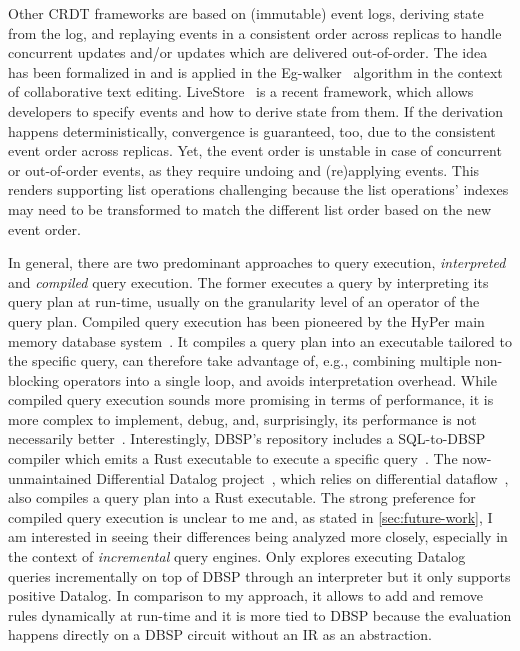 Other \ac{CRDT} frameworks are based on (immutable) event logs, deriving state
from the log, and replaying events in a consistent order across replicas to
handle concurrent updates and/or updates which are delivered out-of-order.
The idea has been formalized in \cite{baquero2017pure} and is applied in
the Eg-walker~\cite{egwalker} algorithm in the context of collaborative text
editing.
LiveStore~\cite{livestore} is a recent framework, which allows developers
to specify events and how to derive state from them.
If the derivation happens deterministically, convergence is guaranteed, too,
due to the consistent event order across replicas.
Yet, the event order is unstable in case of concurrent or out-of-order events,
as they require undoing and (re)applying events.
This renders supporting list operations challenging because the list operations'
indexes may need to be transformed to match the different list order based on
the new event order.

In general, there are two predominant approaches to query execution,
\emph{interpreted} and \emph{compiled} query execution.
The former executes a query by interpreting its query plan at run-time,
usually on the granularity level of an operator of the query plan.
Compiled query execution has been pioneered by the HyPer main memory database
system~\cite{neumann2011efficiently}.
It compiles a query plan into an executable tailored to the specific query,
can therefore take advantage of, e.g., combining multiple non-blocking operators
into a single loop, and avoids interpretation overhead.
While compiled query execution sounds more promising in terms of performance,
it is more complex to implement, debug, and, surprisingly, its performance
is not necessarily better~\cite{kersten2018everything}.
Interestingly, DBSP's repository includes a SQL-to-DBSP compiler which emits
a Rust executable to execute a specific query~\cite{felderarepo}.
The now-unmaintained Differential Datalog project~\cite{ddlog, ddlogpaper},
which relies on differential dataflow~\cite{mcsherry2013differential},
also compiles a query plan into a Rust executable.
The strong preference for compiled query execution is unclear to me and,
as stated in \ref{sec:future-work}, I am interested in seeing their differences
being analyzed more closely, especially in the context of \emph{incremental}
query engines.
Only \cite{dynamicdatalog} explores executing Datalog queries incrementally
on top of DBSP through an interpreter but it only supports positive Datalog.
In comparison to my approach, it allows to add and remove rules dynamically
at run-time and it is more tied to DBSP because the evaluation happens
directly on a DBSP circuit without an \ac{IR} as an abstraction.

